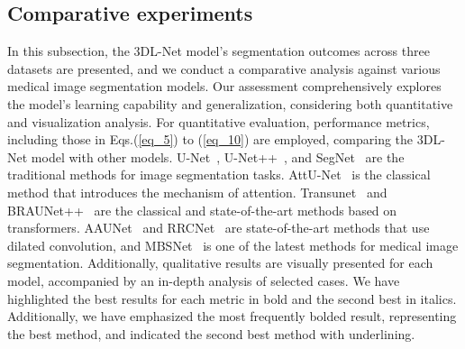 \documentclass[review]{elsarticle}
\begin{document}
	\subsection{Comparative experiments}
	In this subsection, the 3DL-Net model's segmentation outcomes across three datasets are presented, and we conduct a comparative analysis against various medical image segmentation models. Our assessment comprehensively explores the model's learning capability and generalization, considering both quantitative and visualization analysis. For quantitative evaluation, performance metrics, including those in Eqs.(\ref{eq_5}) to (\ref{eq_10}) are employed, comparing the 3DL-Net model with other models. U-Net~\cite{ronneberger2015u}, U-Net++~\cite{zhou2018unet++}, and SegNet~\cite{badrinarayanan2017segnet} are the traditional methods for image segmentation tasks. AttU-Net~\cite{oktay2018attention} is the classical method that introduces the mechanism of attention. Transunet~\cite{chen2021transunet} and BRAUNet++~\cite{lan2024brau} are the classical and state-of-the-art methods based on transformers. AAUNet~\cite{chen2022aau} and RRCNet~\cite{chen2023rrcnet} are state-of-the-art methods that use dilated convolution, and MBSNet~\cite{jin2023novel} is one of the latest methods for medical image segmentation. Additionally, qualitative results are visually presented for each model, accompanied by an in-depth analysis of selected cases. We have highlighted the best results for each metric in bold and the second best in italics. Additionally, we have emphasized the most frequently bolded result, representing the best method, and indicated the second best method with underlining.
	
\end{document}
